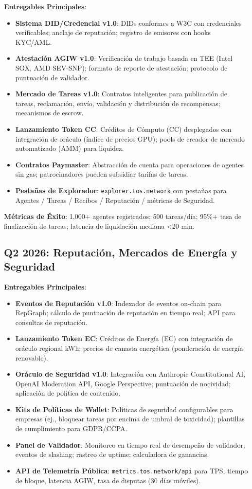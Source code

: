 \documentclass[11pt]{article}
\begin{document}
\textbf{Entregables Principales}:
\begin{itemize}[noitemsep]
  \item \textbf{Sistema DID/Credencial v1.0}: DIDs conformes a W3C con credenciales verificables; anclaje de reputación; registro de emisores con hooks KYC/AML.
  \item \textbf{Atestación AGIW v1.0}: Verificación de trabajo basada en TEE (Intel SGX, AMD SEV-SNP); formato de reporte de atestación; protocolo de puntuación de validador.
  \item \textbf{Mercado de Tareas v1.0}: Contratos inteligentes para publicación de tareas, reclamación, envío, validación y distribución de recompensas; mecanismos de escrow.
  \item \textbf{Lanzamiento Token CC}: Créditos de Cómputo (CC) desplegados con integración de oráculo (índice de precios GPU); pools de creador de mercado automatizado (AMM) para liquidez.
  \item \textbf{Contratos Paymaster}: Abstracción de cuenta para operaciones de agentes sin gas; patrocinadores pueden subsidiar tarifas de tareas.
  \item \textbf{Pestañas de Explorador}: \texttt{explorer.tos.network} con pestañas para Agentes / Tareas / Recibos / Reputación / métricas de Seguridad.
\end{itemize}

\textbf{Métricas de Éxito}: 1,000+ agentes registrados; 500 tareas/día; 95\%+ tasa de finalización de tareas; latencia de liquidación mediana <20 min.

\subsection{Q2 2026: Reputación, Mercados de Energía y Seguridad}

\textbf{Entregables Principales}:
\begin{itemize}[noitemsep]
  \item \textbf{Eventos de Reputación v1.0}: Indexador de eventos on-chain para RepGraph; cálculo de puntuación de reputación en tiempo real; API para consultas de reputación.
  \item \textbf{Lanzamiento Token EC}: Créditos de Energía (EC) con integración de oráculo regional kWh; precios de canasta energética (ponderación de energía renovable).
  \item \textbf{Oráculo de Seguridad v1.0}: Integración con Anthropic Constitutional AI, OpenAI Moderation API, Google Perspective; puntuación de nocividad; aplicación de política de contenido.
  \item \textbf{Kits de Políticas de Wallet}: Políticas de seguridad configurables para empresas (ej., bloquear tareas por encima de umbral de toxicidad); plantillas de cumplimiento para GDPR/CCPA.
  \item \textbf{Panel de Validador}: Monitoreo en tiempo real de desempeño de validador; eventos de slashing; rastreo de uptime; calculadora de ganancias.
  \item \textbf{API de Telemetría Pública}: \texttt{metrics.tos.network/api} para TPS, tiempo de bloque, latencia AGIW, tasa de disputas (30 días móviles).
\end{itemize}
\end{document}
